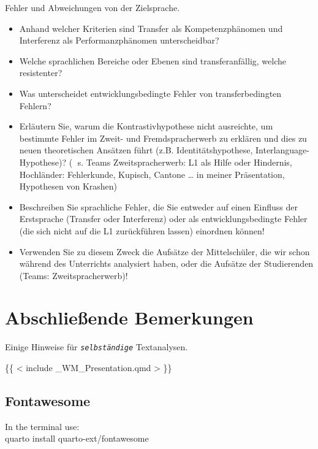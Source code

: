 \documentclass[
  letterpaper,
]{scrbook}
\begin{document}
Fehler und Abweichungen von der Zielsprache.

\begin{itemize}
\item
  Anhand welcher Kriterien sind Transfer als Kompetenzphänomen und
  Interferenz als Performanzphänomen unterscheidbar?
\item
  Welche sprachlichen Bereiche oder Ebenen sind transferanfällig, welche
  resistenter?
\item
  Was unterscheidet entwicklungsbedingte Fehler von transferbedingten
  Fehlern?
\item
  Erläutern Sie, warum die Kontrastivhypothese nicht ausreichte, um
  bestimmte Fehler im Zweit- und Fremdspracherwerb zu erklären und dies
  zu neuen theoretischen Ansätzen führt (z.B. Identitätshypothese,
  Interlanguage-Hypothese)? ( s. Teams Zweitspracherwerb: L1 als Hilfe
  oder Hindernis, Hochländer: Fehlerkunde, Kupisch, Cantone \ldots{} in
  meiner Präsentation, Hypothesen von Krashen)
\item
  Beschreiben Sie sprachliche Fehler, die Sie entweder auf einen
  Einfluss der Erstsprache (Transfer oder Interferenz) oder als
  entwicklungsbedingte Fehler (die sich nicht auf die L1 zurückführen
  lassen) einordnen können!
\item
  Verwenden Sie zu diesem Zweck die Aufsätze der Mittelschüler, die wir
  schon während des Unterrichts analysiert haben, oder die Aufsätze der
  Studierenden (Teams: Zweitspracherwerb)!
\end{itemize}


\hypertarget{abschlieuxdfende-bemerkungen}{%
\chapter{Abschließende Bemerkungen}\label{abschlieuxdfende-bemerkungen}}

Einige Hinweise für \emph{\texttt{selbständige}} Textanalysen. 🤗

\{\{ \textless{} include \_WM\_Presentation.qmd \textgreater{} \}\}

\hypertarget{fontawesome}{%
\section{Fontawesome}\label{fontawesome}}

In the terminal use:\\
quarto install quarto-ext/fontawesome
\end{document}

